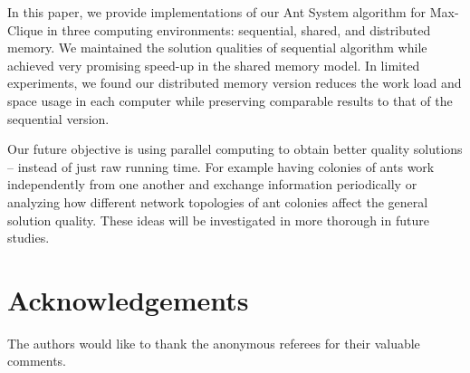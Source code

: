 \documentclass[11pt]{article}
\begin{document}


In this paper, we provide implementations of our Ant System algorithm for Max-Clique in three computing environments: sequential, shared, and distributed memory.   We maintained the solution qualities of sequential algorithm while achieved very promising speed-up in the shared memory model. In limited experiments, we found our distributed memory version reduces the work load and space usage in each computer while preserving comparable results to that of the sequential version.

Our future objective is using parallel computing to obtain better quality solutions -- instead of just raw running time.  For example having colonies of ants work independently from one another and exchange information periodically or analyzing how different network topologies of ant colonies affect the general solution quality. These ideas will be investigated in more thorough in future studies.  %








\section{Acknowledgements}

The authors would like to thank the anonymous referees for their valuable comments.
\end{document}
